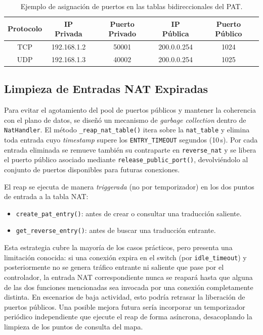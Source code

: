 \documentclass[11pt, a4paper]{article}
\begin{document}
\begin{table}[h!]
\centering
\begin{tabular}{ccccc}
\toprule
\textbf{Protocolo} & \textbf{IP Privada} & \textbf{Puerto Privado} & \textbf{IP Pública} & \textbf{Puerto Público} \\
\midrule
TCP & 192.168.1.2 & 50001 & 200.0.0.254 & 1024 \\
UDP & 192.168.1.3 & 40002 & 200.0.0.254 & 1025 \\
\bottomrule
\end{tabular}
\caption{Ejemplo de asignación de puertos en las tablas bidireccionales del PAT.}
\label{tab:ejemplo_nat}
\end{table}

\subsection{Limpieza de Entradas NAT Expiradas}
\label{subsec:gc_nat}

Para evitar el agotamiento del pool de puertos públicos y mantener la coherencia con el plano de datos, se diseñó un mecanismo de \textit{garbage collection} dentro de \texttt{NatHandler}. El método \texttt{\_reap\_nat\_table()} itera sobre la \texttt{nat\_table} y elimina toda entrada cuyo \textit{timestamp} supere los \texttt{ENTRY\_TIMEOUT} segundos (10\,s). Por cada entrada eliminada se remueve también su contraparte en \texttt{reverse\_nat} y se libera el puerto público asociado mediante \texttt{release\_public\_port()}, devolviéndolo al conjunto de puertos disponibles para futuras conexiones.

El reap se ejecuta de manera \textit{triggerada} (no por temporizador) en los dos puntos de entrada a la tabla NAT:
\begin{itemize}
    \item \texttt{create\_pat\_entry()}: antes de crear o consultar una traducción saliente.
    \item \texttt{get\_reverse\_entry()}: antes de buscar una traducción entrante.
\end{itemize}

Esta estrategia cubre la mayoría de los casos prácticos, pero presenta una limitación conocida: si una conexión expira en el switch (por \texttt{idle\_timeout}) y posteriormente no se genera tráfico entrante ni saliente que pase por el controlador, la entrada NAT correspondiente nunca se reapará hasta que alguna de las dos funciones mencionadas sea invocada por una conexión completamente distinta. En escenarios de baja actividad, esto podría retrasar la liberación de puertos públicos. Una posible mejora futura sería incorporar un temporizador periódico independiente que ejecute el reap de forma asíncrona, desacoplando la limpieza de los puntos de consulta del mapa.
\end{document}
